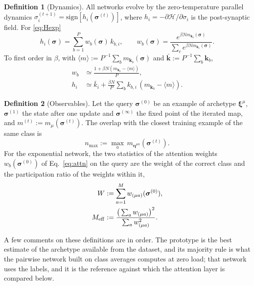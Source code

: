 \documentclass{SciPost}
\theoremstyle{plain}
\theoremstyle{definition}
\newtheorem{definition}{Definition}
\newcommand{\s}{\bm{\sigma}}
\newcommand{\x}{\bm{\xi}}
\newcommand{\e}{\bm{\eta}}
\newcommand{\Meff}{M_{\rm eff}}
\newcommand{\sgn}{\mathrm{sign}}
\begin{document}
\begin{definition}[Dynamics]\label{def:dyn}
All networks evolve by the zero-temperature parallel dynamics $\sigma_i^{(t+1)}=\sgn[h_i(\s^{(t)})]$, where $h_i=-\partial\mathcal H/\partial\sigma_i$ is the post-synaptic field. For \eqref{eq:Hexp}
\begin{equation}
h_i(\s)=\sum_{b=1}^P w_b(\s)\,k_{b,i},\qquad w_b(\s)=\frac{e^{\beta N m_{\bm k_b}(\s)}}{\sum_{c}e^{\beta N m_{\bm k_c}(\s)}}.
\label{eq:attn}
\end{equation}
To first order in $\beta$, with $\langle m\rangle:=P^{-1}\sum_bm_{\bm k_b}(\s)$ and $\bar{\bm k}:=P^{-1}\sum_b\bm k_b$,
\begin{align}
w_b&\simeq\frac{1+\beta N(m_{\bm k_b}-\langle m\rangle)}{P},\nonumber\\
h_i&\simeq\bar k_i+\frac{\beta N}{P}\sum_b k_{b,i}\,(m_{\bm k_b}-\langle m\rangle).\label{eq:smallbeta}
\end{align}
\end{definition}

\begin{definition}[Observables]\label{def:obs}
Let the query $\s^{(0)}$ be an example of archetype $\x^\mu$, $\s^{(1)}$ the state after one update and $\s^{(\infty)}$ the fixed point of the iterated map, and $m^{(t)}:=m_\mu(\s^{(t)})$. The overlap with the closest training example of the same class is
\begin{equation}
n_{\max}:=\max_{a}\,m_{\e^{\mu a}}(\s^{(t)}).
\end{equation}
For the exponential network, the two statistics of the attention weights $w_b(\s^{(0)})$ of Eq.\ \eqref{eq:attn} on the query are the weight of the correct class and the participation ratio of the weights within it,
\begin{align}
W&:=\sum_{a=1}^M w_{(\mu a)}(\s^{(0)}),\label{eq:Wdef}\\
\Meff&:=\frac{\big(\sum_a w_{(\mu a)}\big)^2}{\sum_a w_{(\mu a)}^2}.\label{eq:Meffdef}
\end{align}
\end{definition}

A few comments on these definitions are in order. The prototype is the best estimate of the archetype available from the dataset, and its majority rule is what the pairwise network built on class averages computes at zero load; that network uses the labels, and it is the reference against which the attention layer is compared below.
\end{document}
